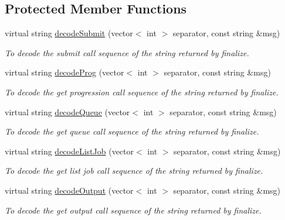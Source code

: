 \subsection*{Protected Member Functions}
\begin{DoxyCompactItemize}
\item 
virtual string \hyperlink{classTMSMapper_aa59a3b07e1d6149067d5c7ecee9d5586}{decodeSubmit} (vector$<$ int $>$ separator, const string \&msg)
\begin{DoxyCompactList}\small\item\em To decode the submit call sequence of the string returned by finalize. \item\end{DoxyCompactList}\item 
virtual string \hyperlink{classTMSMapper_aaf50d5b60f32283e5d6785c839446cdc}{decodeProg} (vector$<$ int $>$ separator, const string \&msg)
\begin{DoxyCompactList}\small\item\em To decode the get progression call sequence of the string returned by finalize. \item\end{DoxyCompactList}\item 
virtual string \hyperlink{classTMSMapper_a214f2d08465fc7a21343c4d74c67c255}{decodeQueue} (vector$<$ int $>$ separator, const string \&msg)
\begin{DoxyCompactList}\small\item\em To decode the get queue call sequence of the string returned by finalize. \item\end{DoxyCompactList}\item 
virtual string \hyperlink{classTMSMapper_a60f6a62060a0587a401da0435a32892f}{decodeListJob} (vector$<$ int $>$ separator, const string \&msg)
\begin{DoxyCompactList}\small\item\em To decode the get list job call sequence of the string returned by finalize. \item\end{DoxyCompactList}\item 
virtual string \hyperlink{classTMSMapper_aae8811bb1bf6bd8830154b1b1331002d}{decodeOutput} (vector$<$ int $>$ separator, const string \&msg)
\begin{DoxyCompactList}\small\item\em To decode the get output call sequence of the string returned by finalize. \item\end{DoxyCompactList}\item 

\end{DoxyCompactItemize}
